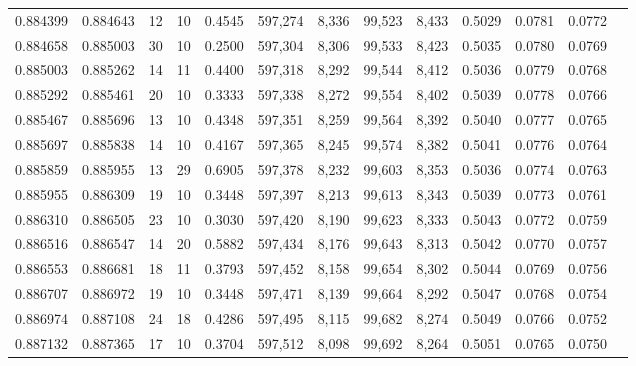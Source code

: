 \begin{tabular}{rrrrrrrrrrrrr}
0.884399 & 0.884643 &    12 &  10 &                                     0.4545 & 597,274 &   8,336 &  99,523 &   8,433 & 0.5029 & 0.0781 & 0.0772 \\
0.884658 & 0.885003 &    30 &  10 &                                     0.2500 & 597,304 &   8,306 &  99,533 &   8,423 & 0.5035 & 0.0780 & 0.0769 \\
0.885003 & 0.885262 &    14 &  11 &                                     0.4400 & 597,318 &   8,292 &  99,544 &   8,412 & 0.5036 & 0.0779 & 0.0768 \\
0.885292 & 0.885461 &    20 &  10 &                                     0.3333 & 597,338 &   8,272 &  99,554 &   8,402 & 0.5039 & 0.0778 & 0.0766 \\
0.885467 & 0.885696 &    13 &  10 &                                     0.4348 & 597,351 &   8,259 &  99,564 &   8,392 & 0.5040 & 0.0777 & 0.0765 \\
0.885697 & 0.885838 &    14 &  10 &                                     0.4167 & 597,365 &   8,245 &  99,574 &   8,382 & 0.5041 & 0.0776 & 0.0764 \\
0.885859 & 0.885955 &    13 &  29 &                                     0.6905 & 597,378 &   8,232 &  99,603 &   8,353 & 0.5036 & 0.0774 & 0.0763 \\
0.885955 & 0.886309 &    19 &  10 &                                     0.3448 & 597,397 &   8,213 &  99,613 &   8,343 & 0.5039 & 0.0773 & 0.0761 \\
0.886310 & 0.886505 &    23 &  10 &                                     0.3030 & 597,420 &   8,190 &  99,623 &   8,333 & 0.5043 & 0.0772 & 0.0759 \\
0.886516 & 0.886547 &    14 &  20 &                                     0.5882 & 597,434 &   8,176 &  99,643 &   8,313 & 0.5042 & 0.0770 & 0.0757 \\
0.886553 & 0.886681 &    18 &  11 &                                     0.3793 & 597,452 &   8,158 &  99,654 &   8,302 & 0.5044 & 0.0769 & 0.0756 \\
0.886707 & 0.886972 &    19 &  10 &                                     0.3448 & 597,471 &   8,139 &  99,664 &   8,292 & 0.5047 & 0.0768 & 0.0754 \\
0.886974 & 0.887108 &    24 &  18 &                                     0.4286 & 597,495 &   8,115 &  99,682 &   8,274 & 0.5049 & 0.0766 & 0.0752 \\
0.887132 & 0.887365 &    17 &  10 &                                     0.3704 & 597,512 &   8,098 &  99,692 &   8,264 & 0.5051 & 0.0765 & 0.0750 \\

\end{tabular}
